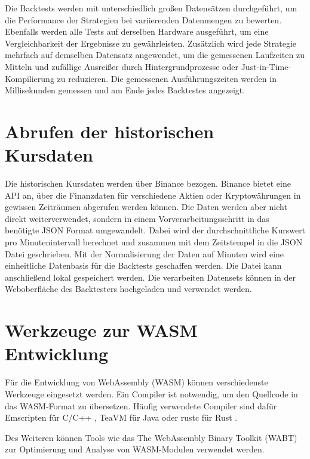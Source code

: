 Die Backtests werden mit unterschiedlich großen Datensätzen durchgeführt, um die Performance der Strategien bei variierenden Datenmengen zu bewerten. 
Ebenfalls werden alle Tests auf derselben Hardware ausgeführt, um eine Vergleichbarkeit der Ergebnisse zu gewährleisten.
Zusätzlich wird jede Strategie mehrfach auf demselben Datensatz angewendet, um die gemessenen Laufzeiten zu Mitteln und zufällige Ausreißer durch Hintergrundprozesse oder Just-in-Time-Kompilierung zu reduzieren.
Die gemessenen Ausführungszeiten werden in Millisekunden gemessen und am Ende jedes Backtestes angezeigt.

\section{Abrufen der historischen Kursdaten}
\label{sec:AbrufenderhistorischenKursdaten}

Die historischen Kursdaten werden über Binance bezogen. \cite{Binance}
Binance bietet eine API an, über die Finanzdaten für verschiedene Aktien oder Kryptowährungen in gewissen Zeiträumen abgerufen werden können.
Die Daten werden aber nicht direkt weiterverwendet, sondern in einem Vorverarbeitungsschritt in das benötigte JSON Format umgewandelt.
Dabei wird der durchschnittliche Kurswert pro Minutenintervall berechnet und zusammen mit dem Zeitstempel in die JSON Datei geschrieben.
Mit der Normalisierung der Daten auf Minuten wird eine einheitliche Datenbasis für die Backtests geschaffen werden.
Die Datei kann anschließend lokal gespeichert werden.
Die verarbeiten Datensets können in der Weboberfläche des Backtesters hochgeladen und verwendet werden.

\section{Werkzeuge zur WASM Entwicklung}
\label{sec:WerkzeugezurWASMEntwicklung}

Für die Entwicklung von WebAssembly (WASM) können verschiedenste Werkzeuge eingesetzt werden. 
Ein Compiler ist notwendig, um den Quellcode in das WASM-Format zu übersetzen.
Häufig verwendete Compiler sind dafür Emscripten für C/C++ \cite{EmscriptenWebsite,EmscriptenGitHub}, TeaVM für Java  \cite{TeaVMWebsite,TeaVMGitHub} oder rustc für Rust \cite{RustToWASMWebsite}.

Des Weiteren können Tools wie das The WebAssembly Binary Toolkit (WABT) \cite{wabtGitHub} zur Optimierung und Analyse von WASM-Modulen verwendet werden.

